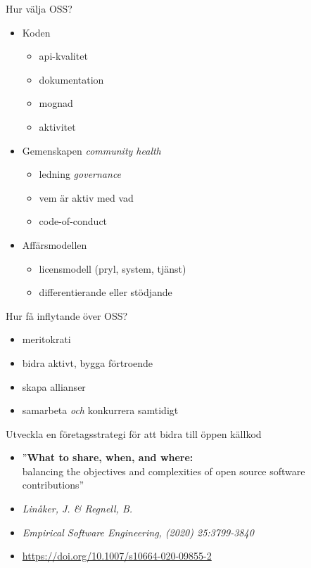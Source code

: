 \documentclass{simpleslides}
\begin{document}
\begin{Slide}{Hur välja OSS?}
\begin{itemize}
\item Koden
\begin{itemize}
\item api-kvalitet 
\item dokumentation
\item mognad
\item aktivitet
\end{itemize}  
\item Gemenskapen \hfill \emph{community health}
\begin{itemize}
\item ledning \hfill \emph{governance}
\item vem är aktiv med vad
\item code-of-conduct 
\end{itemize}  
\item Affärsmodellen
\begin{itemize}
\item licensmodell (pryl, system, tjänst)
\item differentierande eller stödjande
\end{itemize}  
\end{itemize}  
\end{Slide}

\begin{Slide}{Hur få inflytande över OSS?}
\begin{itemize}
  \item meritokrati
  \item bidra aktivt, bygga förtroende
  \item skapa allianser
  \item samarbeta \emph{och} konkurrera samtidigt
\end{itemize}  
\end{Slide}


\begin{Slide}{Utveckla en företagsstrategi för att bidra till öppen källkod}
\begin{itemize}\small
  \item[] ''\textbf{What to share, when, and where:}\\balancing the objectives and complexities of open source software contributions''
  \item[] \emph{Linåker, J. \& Regnell, B.} 
  \item[] \emph{\tiny Empirical Software Engineering, (2020) 25:3799-3840} 
  \item[] {\tiny \url{https://doi.org/10.1007/s10664-020-09855-2}}
\end{itemize}  
\end{Slide}


\end{document}
